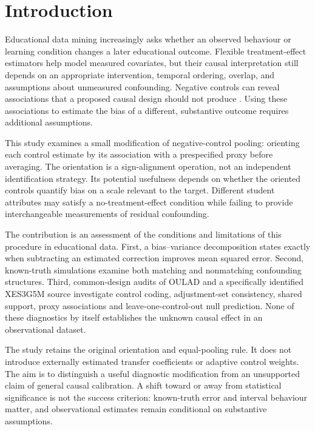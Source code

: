 \section{Introduction}

Educational data mining increasingly asks whether an observed behaviour or learning condition changes a later educational outcome. Flexible treatment-effect estimators help model measured covariates, but their causal interpretation still depends on an appropriate intervention, temporal ordering, overlap, and assumptions about unmeasured confounding. Negative controls can reveal associations that a proposed causal design should not produce \cite{lipsitch2010}. Using these associations to estimate the bias of a different, substantive outcome requires additional assumptions.

This study examines a small modification of negative-control pooling: orienting each control estimate by its association with a prespecified proxy before averaging. The orientation is a sign-alignment operation, not an independent identification strategy. Its potential usefulness depends on whether the oriented controls quantify bias on a scale relevant to the target. Different student attributes may satisfy a no-treatment-effect condition while failing to provide interchangeable measurements of residual confounding.

The contribution is an assessment of the conditions and limitations of this procedure in educational data. First, a bias--variance decomposition states exactly when subtracting an estimated correction improves mean squared error. Second, known-truth simulations examine both matching and nonmatching confounding structures. Third, common-design audits of OULAD and a specifically identified XES3G5M source investigate control coding, adjustment-set consistency, shared support, proxy associations and leave-one-control-out null prediction. None of these diagnostics by itself establishes the unknown causal effect in an observational dataset.

The study retains the original orientation and equal-pooling rule. It does not introduce externally estimated transfer coefficients or adaptive control weights. The aim is to distinguish a useful diagnostic modification from an unsupported claim of general causal calibration. A shift toward or away from statistical significance is not the success criterion: known-truth error and interval behaviour matter, and observational estimates remain conditional on substantive assumptions.

